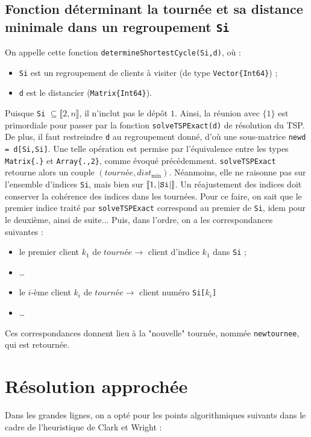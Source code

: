 \documentclass[french, 11pt, a4paper]{article} %
\newcommand{\smb}{\smallbreak}
\begin{document}
\subsection{Fonction déterminant la tournée et sa distance minimale dans un regroupement \texttt{Si}}
On appelle cette fonction \texttt{determineShortestCycle(Si,d)}, où : 
\begin{itemize}
    \item \verb+Si+ est un regroupement de clients à visiter (de type \verb+Vector{Int64}+) ;
    \item \verb+d+ est le distancier (\verb+Matrix{Int64}+).
\end{itemize}
\smb Puisque \verb+Si+ $\subseteq \llbracket 2,n \rrbracket$, il n'inclut pas le dépôt $1$. Ainsi, la réunion avec $\{1\}$
est primordiale pour passer par la fonction \verb+solveTSPExact(d)+ de résolution du TSP.
\smb De plus, il faut restreindre \verb+d+ au regroupement donné, d'où une sous-matrice
\verb+newd = d[Si,Si]+. Une telle opération est permise par l'équivalence entre les types
\verb+Matrix{.}+ et \verb+Array{.,2}+, comme évoqué précédemment.
\smb \verb+solveTSPExact+ retourne alors un couple $(tourn\text{é}e,dist_{\text{min}})$. Néanmoins, elle ne raisonne pas sur l'ensemble d'indices \verb+Si+, mais bien sur
$\llbracket 1,|\text{\texttt{Si}}| \rrbracket$. 
\smb Un réajustement des indices doit conserver la cohérence
des indices dans les tournées. Pour ce faire, on sait que le premier indice traité par \verb+solveTSPExact+ correspond au premier de \verb+Si+,
idem pour le deuxième, ainsi de suite... Puis, dans l'ordre, on a les correspondances suivantes :
\begin{itemize}
    \item le premier client $k_1$ de $tourn\text{é}e \longrightarrow$ client d'indice $k_1$ dans \verb+Si+ ;
    \item \dots
    \item le $i$-ème client $k_i$ de $tourn\text{é}e \longrightarrow$ client numéro \verb+Si[+$k_i$\verb+]+
    \item \dots
\end{itemize}

Ces correspondances donnent lieu à la "nouvelle" tournée, nommée \verb+newtournee+, qui est retournée.

\section{Résolution approchée}

Dans les grandes lignes, on a opté pour les points algorithmiques suivants dans le cadre de l'heuristique de Clark et Wright :
\end{document}
